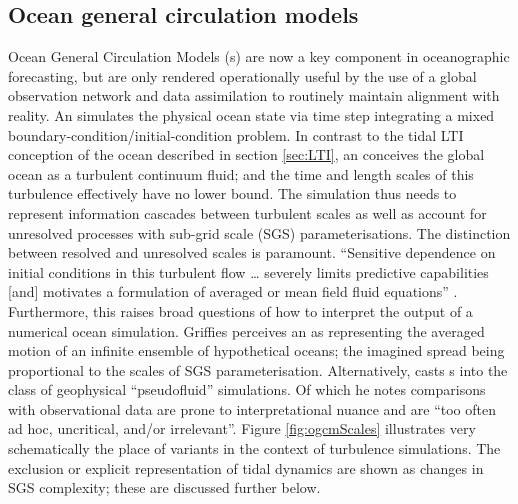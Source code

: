\subsection{Ocean general circulation models}
Ocean General Circulation Models (\OGCM{}s) are now a key component in oceanographic forecasting, but are only rendered operationally useful by the use of a global observation network and data assimilation to routinely maintain alignment with reality.
An \OGCM{} simulates the physical ocean state via time step integrating a mixed boundary-condition/initial-condition problem.
In contrast to the tidal LTI conception of the ocean described in section \ref{sec:LTI}, an \OGCM{} conceives the global ocean as a turbulent continuum fluid; and the time and length scales of this turbulence effectively have no lower bound. The simulation thus needs to represent information cascades between turbulent scales as well as account for unresolved processes with sub-grid scale (SGS) parameterisations.
The distinction between resolved and unresolved scales is paramount.  ``Sensitive dependence on initial conditions in this turbulent flow \dots{} severely limits predictive capabilities [and] motivates a formulation of averaged or mean field fluid equations'' \citep[Sec 2.5]{Griffies:2004vs}.
Furthermore, this raises broad questions of how to interpret the output of a numerical ocean simulation.
Griffies perceives an \OGCM{} as representing the averaged motion of an infinite ensemble of hypothetical oceans; the imagined spread being proportional to the scales of SGS parameterisation.
Alternatively, \citet{Stevens:2001kb} casts \OGCM{}s into the class of geophysical ``pseudofluid'' simulations. Of which he notes comparisons with observational data are prone to interpretational nuance and are ``too often ad hoc, uncritical, and/or irrelevant''\citep[pp 286]{Stevens:2001kb}. 
Figure \ref{fig:ogcmScales} illustrates very schematically the place of \OGCM{} variants in the context of turbulence simulations.   The exclusion or explicit representation of tidal dynamics are shown as changes in SGS complexity; these are discussed further below.
